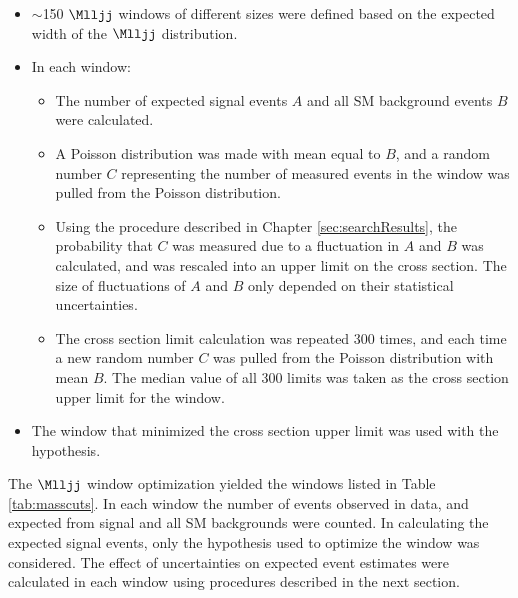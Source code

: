 \begin{itemize}
	\item $\sim$150 $\Mlljj$ windows of different sizes were defined based on the expected width of the \WR $\Mlljj$ distribution.
	\item In each window:
	\begin{itemize}
		\item The number of expected signal events $A$ and all SM background events $B$ were calculated.
		\item A Poisson distribution was made with mean equal to $B$, and a random number $C$ representing 
			the number of measured events in the window was pulled from the Poisson distribution.
		\item Using the procedure described in Chapter \ref{sec:searchResults}, the probability that $C$ 
			was measured due to a fluctuation in $A$ and $B$ was calculated, and was rescaled into an 
			upper limit on the \WR cross section.  The size of fluctuations of $A$ and $B$ only depended 
			on their statistical uncertainties.
		\item The cross section limit calculation was repeated 300 times, and each time a new random 
			number $C$ was pulled from the Poisson distribution with mean $B$.  The median value of 
			all 300 limits was taken as the cross section upper limit for the window.
	\end{itemize}
	\item The window that minimized the \WR cross section upper limit was used with the \mWR hypothesis.
\end{itemize}

The $\Mlljj$ window optimization yielded the windows listed in Table \ref{tab:masscuts}.  In each 
window the number of events observed in data, and expected from \WR signal and all SM backgrounds 
were counted.  In calculating the expected \WR signal events, only the \mWR hypothesis used to 
optimize the window was considered.  The effect of uncertainties on expected event estimates were 
calculated in each window using procedures described in the next section.

